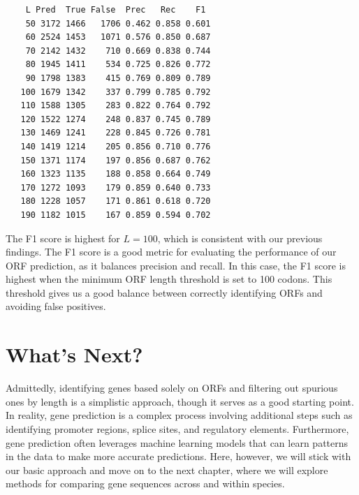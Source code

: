 \vspace*{3mm}
\begin{lstlisting}
    L Pred  True False  Prec   Rec    F1
    50 3172 1466   1706 0.462 0.858 0.601
    60 2524 1453   1071 0.576 0.850 0.687
    70 2142 1432    710 0.669 0.838 0.744
    80 1945 1411    534 0.725 0.826 0.772
    90 1798 1383    415 0.769 0.809 0.789
   100 1679 1342    337 0.799 0.785 0.792
   110 1588 1305    283 0.822 0.764 0.792
   120 1522 1274    248 0.837 0.745 0.789
   130 1469 1241    228 0.845 0.726 0.781
   140 1419 1214    205 0.856 0.710 0.776
   150 1371 1174    197 0.856 0.687 0.762
   160 1323 1135    188 0.858 0.664 0.749
   170 1272 1093    179 0.859 0.640 0.733
   180 1228 1057    171 0.861 0.618 0.720
   190 1182 1015    167 0.859 0.594 0.702
\end{lstlisting}

The F1 score is highest for $L=100$, which is consistent with our previous findings. The F1 score is a good metric for evaluating the performance of our ORF prediction, as it balances precision and recall. In this case, the F1 score is highest when the minimum ORF length threshold is set to 100 codons. This threshold gives us a good balance between correctly identifying ORFs and avoiding false positives.

\section{What's Next?}

Admittedly, identifying genes based solely on ORFs and filtering out spurious ones by length is a simplistic approach, though it serves as a good starting point. In reality, gene prediction is a complex process involving additional steps such as identifying promoter regions, splice sites, and regulatory elements. Furthermore, gene prediction often leverages machine learning models that can learn patterns in the data to make more accurate predictions. Here, however, we will stick with our basic approach and move on to the next chapter, where we will explore methods for comparing gene sequences across and within species.